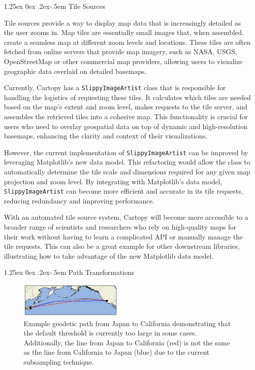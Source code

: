 \documentclass[12pt]{article}
\makeatletter
\numberwithin{page}{section}
\renewcommand{\paragraph}{%
  \@startsection{paragraph}{4}%
  {\z@}{1.25ex \@plus 0ex \@minus .2ex}{-.5em}%
  {\normalfont\normalsize\itshape\bfseries}%
}
\makeatother
\begin{document}
\paragraph{Tile Sources}

Tile sources provide a way to display map data that is increasingly detailed
as the user zooms
in. Map tiles are essentially small images that, when assembled, create a seamless map at
different zoom levels and locations. These tiles are often fetched from online servers
that provide map imagery, such as NASA, USGS, OpenStreetMap or other commercial map providers,
allowing users to visualize geographic data overlaid on detailed basemaps.

Currently, Cartopy has a \texttt{SlippyImageArtist} class that is responsible for handling the
logistics of requesting these tiles. It calculates which tiles are needed based on the
map's extent and zoom level, makes requests to the tile server, and assembles the retrieved
tiles into a cohesive map. This functionality is crucial for users who need to overlay geospatial
data on top of dynamic and high-resolution basemaps, enhancing the clarity and context of
their visualizations.

However, the current implementation of \texttt{SlippyImageArtist} can be improved by leveraging
Matplotlib's new data model. This refactoring would allow the class to automatically determine
the tile scale and dimensions required for any given map projection and zoom level. By integrating
with Matplotlib's data model, \texttt{SlippyImageArtist} can become more efficient and accurate in
its tile requests, reducing redundancy and improving performance.

With an automated tile source system, Cartopy will become more accessible to a broader range of
scientists and researchers who rely on high-quality maps for their work without having to learn
a complicated API or manually manage the tile requests. This can also be a great example for other
downstream libraries, illustrating how to take advantage of the new Matplotlib data model.

\paragraph{Path Transformations}

\begin{figure}
  \includegraphics[width=0.45\textwidth]{supplemental/cartopy_interpolation}
  \caption{\small Example geodetic path from Japan to California demonstrating
  that the default threshold is currently too large in some cases. Additionally,
  the line from Japan to California (red) is not the same as the line from
  California to Japan (blue) due to the current subsampling technique.}
  \label{fig:cartopy_interpolation}
\end{figure}
\end{document}
